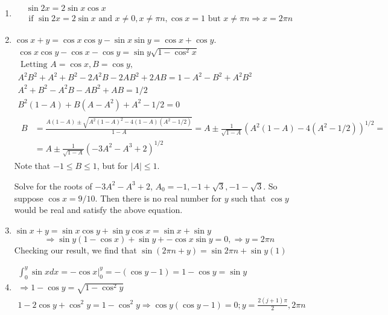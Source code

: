 \documentclass[twoside]{amsart}
\theoremstyle{plain}
\theoremstyle{definition}
\newcommand{\exercisehead}[1]
  {\smallskip
   \noindent{\small\bf Exercise #1.}}
\begin{document}
\exercisehead{16} 
\begin{enumerate}
\item \[
\begin{gathered}
  \sin{2x} = 2 \sin{x} \cos{x} \\
  \text{ if } \sin{2x} = 2 \sin{x} \text{ and } x \neq 0, x \neq \pi n, \cos{x} = 1 \text{ but } x \neq \pi n \Longrightarrow \boxed{ x = 2 \pi n }
\end{gathered}
\]
\item $\cos{x+y} = \cos{x} \cos{y} - \sin{x} \sin{y} = \cos{x} + \cos{y}$.  
\[
\begin{gathered}
  \cos{x} \cos{y} - \cos{x} - \cos{y} = \sin{y} \sqrt{1-\cos^2{x} }  \\
  \text{ Letting } A = \cos{x}, B = \cos{y}, \\
  A^2 B^2 +A^2 +B^2 -2A^2 B - 2AB^2 + 2AB = 1 - A^2 - B^2 + A^2 B^2 \\
  A^2 + B^2 -A^2 B - AB^2 + AB = 1/2 \\
  B^2 (1-A) + B(A-A^2) +A^2 -1/2 = 0 \\
  \begin{aligned}
  B & = \frac{ A(1-A) \pm \sqrt{A^2(1-A)^2 - 4 (1-A)(A^2 - 1/2) } }{ 1-A} = A \pm \frac{ 1}{ \sqrt{1-A}} (A^2 (1-A) -4 (A^2 -1/2) )^{1/2} = \\ 
  & = A \pm \frac{1}{\sqrt{1-A}} ( -3A^2 -A^3 +2 )^{1/2}
\end{aligned}
\end{gathered}
\]
Note that $-1 \leq B \leq 1$, but for $|A| \leq 1$.

Solve for the roots of $-3A^2-A^3 +2$, $A_0 = -1, -1 +\sqrt{3}, -1 -\sqrt{3}$.  So suppose $\cos{x} = 9/10$.  Then there is no real number for $y$ such that $\cos{y}$ would be real and satisfy the above equation.

\item $ \sin{x+y} = \sin{x} \cos{y} + \sin{y} \cos{x} = \sin{x} + \sin{y}$ 
\[
\Longrightarrow \sin{y}(1- \cos{x}) + \sin{y} + -\cos{x}\sin{y} =0, \Longrightarrow y=2\pi n
\]
Checking our result, we find that $\sin{(2\pi n + y)} = \sin{2\pi n} + \sin{y} (1)$
\item \[
\begin{gathered}
 \int_0^y \sin{x} dx = \left. -\cos{x} \right|_0^y  = - (\cos{y} -1) = 1 - \cos{y} = \sin{y}  \\
 \Longrightarrow 1 -\cos{y} = \sqrt{ 1 - \cos^2{y} }  \\
 1 - 2 \cos{y} + \cos^2{y} = 1 - \cos^2{y} \Longrightarrow  \cos{y} ( \cos{y}-1) = 0 ; y = \frac{ 2(j+1)\pi}{2}, 2\pi n
\end{gathered}
\]
\end{enumerate}
\end{document}
